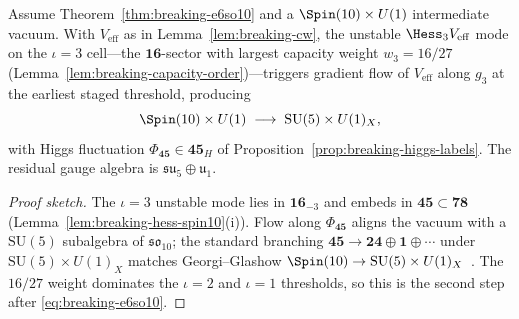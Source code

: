 \begin{theorem}\label{thm:breaking-so10su5}
Assume Theorem~\ref{thm:breaking-e6so10} and a $\Spin(10)\times U(1)$
intermediate vacuum. With $V_{\mathrm{eff}}$ as in Lemma~\ref{lem:breaking-cw},
the unstable $\Hess_3 V_{\mathrm{eff}}$ mode on the $\iota=3$ cell---the
$\mathbf{16}$-sector with largest capacity weight $w_3=16/27$
(Lemma~\ref{lem:breaking-capacity-order})---triggers gradient flow of
$V_{\mathrm{eff}}$ along $g_3$ at the earliest staged threshold, producing
\begin{equation}\label{eq:breaking-so10su5}
  \Spin(10)\times U(1)\;\longrightarrow\;\mathrm{SU}(5)\times U(1)_X,
\end{equation}
with Higgs fluctuation $\Phi_{\mathbf{45}}\in\mathbf{45}_H$ of
Proposition~\ref{prop:breaking-higgs-labels}. The residual gauge algebra is
$\mathfrak{su}_5\oplus\mathfrak{u}_1$.
\end{theorem}

\begin{proof}[Proof sketch]
The $\iota=3$ unstable mode lies in $\mathbf{16}_{-3}$ and embeds in
$\mathbf{45}\subset\mathbf{78}$ (Lemma~\ref{lem:breaking-hess-spin10}(i)).
Flow along $\Phi_{\mathbf{45}}$ aligns the vacuum with a $\mathrm{SU}(5)$
subalgebra of $\mathfrak{so}_{10}$; the standard branching
$\mathbf{45}\to\mathbf{24}\oplus\mathbf{1}\oplus\cdots$ under
$\mathrm{SU}(5)\times U(1)_X$ matches Georgi--Glashow
$\Spin(10)\to\mathrm{SU}(5)\times U(1)_X$~\cite{GeorgiGlashow1974}. The
$16/27$ weight dominates the $\iota=2$ and $\iota=1$ thresholds, so this is
the second step after \eqref{eq:breaking-e6so10}.
\end{proof}


